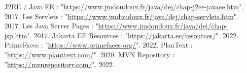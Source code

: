 \documentclass[a4paper]{report}
\begin{document}


\newcommand{\HRule}{\rule{\linewidth}{0.5mm}}








\tableofcontents
\newpage


\renewcommand{\arraystretch}{1.5}













\begin{thebibliography}{00}
\vspace{3cm}
 J2EE / Java EE : "\url{https://www.jmdoudoux.fr/java/dej/chap-j2ee-javaee.htm}". 2017.
\vspace{.4cm}
 Les Servlets : "\url{https://www.jmdoudoux.fr/java/dej/chap-servlets.htm}". 2017.
\vspace{.4cm}
 Les Java Server Pages : "\url{https://www.jmdoudoux.fr/java/dej/chap-jsp.htm}". 2017.
\vspace{.4cm}
 Jakarta EE Resources : "\url{https://jakarta.ee/resources/}". 2022.
\vspace{.4cm}
 PrimeFaces : "\url{https://www.primefaces.org/}". 2022.
\vspace{.4cm}
 PlanText : "\url{https://www.planttext.com/}". 2020.
\vspace{.4cm}
 MVN Repository : "\url{https://mvnrepository.com/}". 2022.
\vspace{.4cm}

\end{thebibliography}
\end{document}
